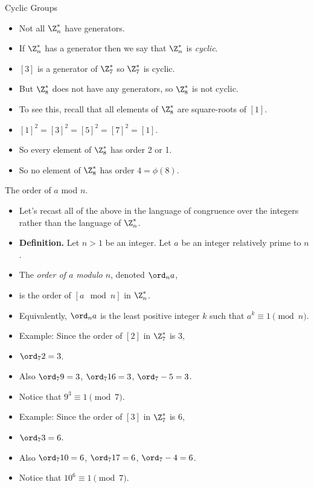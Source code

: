 \documentclass[handout]{beamer}
\begin{document}
\begin{frame}{Cyclic Groups}

\begin{itemize}
  \item Not all $\Z_n^*$ have generators.
  \item If $\Z_n^*$ has a generator then we say that $\Z_n^*$ is \emph{cyclic}.
  \item $[3]$ is a generator of $\Z_7^*$ so $\Z_7^*$ is cyclic.
  \item But $\Z_8^*$ does not have any generators, so $\Z_8^*$ is not cyclic.
  \item To see this, recall that all elements of $\Z_8^*$ are square-roots of $[1]$.
  \item $[1]^2 = [3]^2 = [5]^2 = [7]^2 = [1]$.
  \item So every element of $\Z_8^*$ has order 2 or 1.
  \item So no element of $\Z_8^*$ has order $4 = \phi(8)$.
\end{itemize}

\end{frame}

\begin{frame}{The order of $a$ mod $n$.}

\begin{itemize}
  \item Let's recast all of the above in the language of congruence over the integers rather than the language of $\Z_n^*$.
  \item \textbf{Definition.} Let $n>1$ be an integer. Let $a$ be an integer relatively prime to $n$.
  \item The \emph{order of $a$ modulo $n$}, denoted $\ord_n a$,
  \item is the order of $[a \mod n]$ in $\Z_n^*$.
  \item Equivalently, $\ord_n a$ is the least positive integer $k$ such that $a^k \equiv 1 \pmod n$.
  \item Example: Since the order of $[2]$ in $\Z_7^*$ is 3,
  \item $\ord_7 2 = 3$.
  \item Also $\ord_7 9 = 3$, $\ord_7 16 = 3$, $\ord_7 -5 = 3$.
  \item Notice that $9^3 \equiv 1 \pmod 7$.
   \item Example: Since the order of $[3]$ in $\Z_7^*$ is 6,
  \item $\ord_7 3 = 6$.
  \item Also $\ord_7 10 = 6$, $\ord_7 17 = 6$, $\ord_7 -4 = 6$.
  \item Notice that $10^6 \equiv 1 \pmod 7$.
\end{itemize}

\end{frame}
\end{document}
